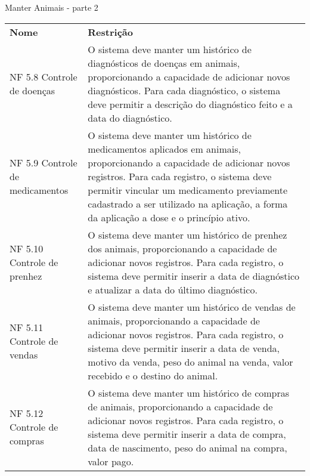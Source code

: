 \begin{tabframed}[!htb]
  \caption{Manter Animais - parte 2}
  \label{quad:requisitoManterAnimaisParte2}
  \renewcommand{\arraystretch}{1.5}
  \begin{tabular}{|l|l|}
    \cline{1-2}

    \textbf{Nome}                                                           &
    \textbf{Restrição}
    \\ \cline{1-2}

    \multicolumn{1}{|p{3cm}|}{\raggedright NF 5.8 Controle de doenças}      &
    \multicolumn{1}{|p{12cm}|}{\raggedright O sistema deve manter um histórico de diagnósticos de doenças em animais, proporcionando a capacidade de adicionar novos diagnósticos. Para cada diagnóstico, o sistema deve permitir a descrição do diagnóstico feito e a data do diagnóstico.}
    \\ \cline{1-2}

    \multicolumn{1}{|p{3cm}|}{\raggedright NF 5.9 Controle de medicamentos} &
    \multicolumn{1}{|p{12cm}|}{\raggedright O sistema deve manter um histórico de medicamentos aplicados em animais, proporcionando a capacidade de adicionar novos registros. Para cada registro, o sistema deve permitir vincular um medicamento previamente cadastrado a ser utilizado na aplicação, a forma da aplicação a dose e o princípio ativo.}
    \\ \cline{1-2}

    \multicolumn{1}{|p{3cm}|}{\raggedright NF 5.10 Controle de prenhez}     &
    \multicolumn{1}{|p{12cm}|}{\raggedright O sistema deve manter um histórico de prenhez dos animais, proporcionando a capacidade de adicionar novos registros. Para cada registro, o sistema deve permitir inserir a data de diagnóstico e atualizar a data do último diagnóstico.}
    \\ \cline{1-2}

    \multicolumn{1}{|p{3cm}|}{\raggedright NF 5.11 Controle de vendas }     &
    \multicolumn{1}{|p{12cm}|}{\raggedright O sistema deve manter um histórico de vendas de animais, proporcionando a capacidade de adicionar novos registros. Para cada registro, o sistema deve permitir inserir a data de venda, motivo da venda, peso do animal na venda, valor recebido e o destino do animal.}
    \\ \cline{1-2}

    \multicolumn{1}{|p{3cm}|}{\raggedright NF 5.12 Controle de compras}     &
    \multicolumn{1}{|p{12cm}|}{\raggedright O sistema deve manter um histórico de compras de animais, proporcionando a capacidade de adicionar novos registros. Para cada registro, o sistema deve permitir inserir a data de compra, data de nascimento, peso do animal na compra, valor pago.}
    \\ \cline{1-2}


\end{tabular}
\end{tabframed}
